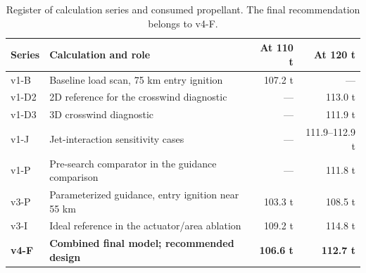 \begin{table}[!htbp]
\centering
\caption{Register of calculation series and consumed propellant. The final recommendation belongs to v4-F.}
\label{tab:versions}
\small
\setlength{\tabcolsep}{4pt}
\begin{tabularx}{\linewidth}{@{}lXrr@{}}
\toprule
Series & Calculation and role & At 110 t & At 120 t\\
\midrule
v1-B & Baseline load scan, 75 km entry ignition & 107.2 t & ---\\
v1-D2 & 2D reference for the crosswind diagnostic & --- & 113.0 t\\
v1-D3 & 3D crosswind diagnostic & --- & 111.9 t\\
v1-J & Jet-interaction sensitivity cases & --- & 111.9--112.9 t\\
v1-P & Pre-search comparator in the guidance comparison & --- & 111.8 t\\
v3-P & Parameterized guidance, entry ignition near 55 km & 103.3 t & 108.5 t\\
v3-I & Ideal reference in the actuator/area ablation & 109.2 t & 114.8 t\\
\textbf{v4-F} & \textbf{Combined final model; recommended design} & \textbf{106.6 t} & \textbf{112.7 t}\\
\bottomrule
\end{tabularx}
\par{}
\end{table}
